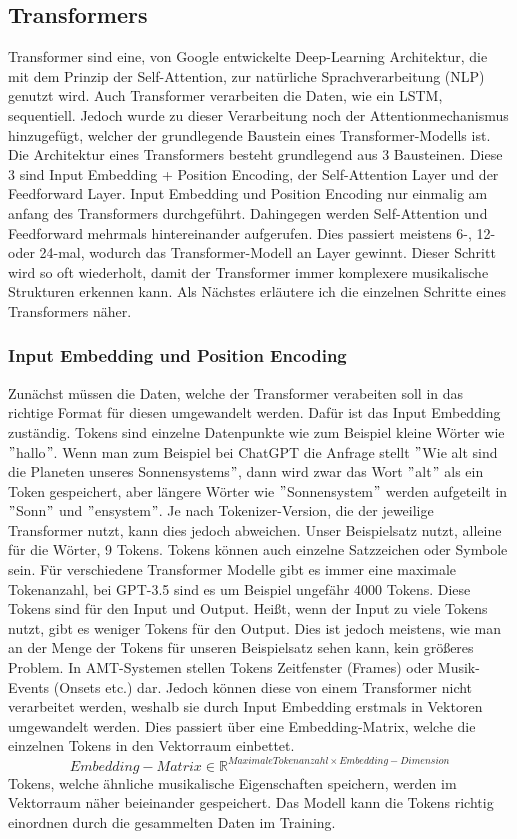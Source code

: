 \subsection{Transformers}
Transformer sind eine, von Google entwickelte Deep-Learning Architektur,
die mit dem Prinzip der Self-Attention, zur natürliche Sprachverarbeitung (NLP) genutzt wird.
Auch Transformer verarbeiten die Daten, wie ein LSTM, sequentiell.
Jedoch wurde zu dieser Verarbeitung noch der Attentionmechanismus hinzugefügt,
welcher der grundlegende Baustein eines Transformer-Modells ist.
Die Architektur eines Transformers besteht grundlegend aus 3 Bausteinen.
Diese 3 sind Input Embedding + Position Encoding, der Self-Attention Layer und der Feedforward Layer.
Input Embedding und Position Encoding nur einmalig am anfang des Transformers durchgeführt.
Dahingegen werden Self-Attention und Feedforward mehrmals hintereinander aufgerufen.
Dies passiert meistens 6-, 12- oder 24-mal, wodurch das Transformer-Modell an Layer gewinnt.
Dieser Schritt wird so oft wiederholt, damit der Transformer immer komplexere musikalische Strukturen erkennen kann.
Als Nächstes erläutere ich die einzelnen Schritte eines Transformers näher.

\subsubsection{Input Embedding und Position Encoding}
Zunächst müssen die Daten, welche der Transformer verabeiten soll in das richtige Format für diesen umgewandelt werden.
Dafür ist das Input Embedding zuständig.
Tokens sind einzelne Datenpunkte wie zum Beispiel kleine Wörter wie \("\)hallo\("\).
Wenn man zum Beispiel bei ChatGPT die Anfrage stellt \("\)Wie alt sind die Planeten unseres Sonnensystems\("\),
dann wird zwar das Wort \("\)alt\("\) als ein Token gespeichert, aber längere Wörter wie \("\)Sonnensystem\("\)
werden aufgeteilt in \("\)Sonn\("\) und \("\)ensystem\("\).
Je nach Tokenizer-Version, die der jeweilige Transformer nutzt, kann dies jedoch abweichen.
Unser Beispielsatz nutzt, alleine für die Wörter, 9 Tokens.
Tokens können auch einzelne Satzzeichen oder Symbole sein.
Für verschiedene Transformer Modelle gibt es immer eine maximale Tokenanzahl,
bei GPT-3.5 sind es um Beispiel ungefähr 4000 Tokens.
Diese Tokens sind für den Input und Output.
Heißt, wenn der Input zu viele Tokens nutzt, gibt es weniger Tokens für den Output.
Dies ist jedoch meistens, wie man an der Menge der Tokens für unseren Beispielsatz sehen kann, kein größeres Problem.
In AMT-Systemen stellen Tokens Zeitfenster (Frames) oder Musik-Events (Onsets etc.) dar.
Jedoch können diese von einem Transformer nicht verarbeitet werden,
weshalb sie durch Input Embedding erstmals in Vektoren  umgewandelt werden.
Dies passiert über eine Embedding-Matrix, welche die einzelnen Tokens in den Vektorraum einbettet.
\[
Embedding-Matrix \in \mathbb{R}^{Maximale Tokenanzahl \times Embedding-Dimension}
\]
Tokens, welche ähnliche musikalische Eigenschaften speichern, werden im Vektorraum näher beieinander gespeichert.
Das Modell kann die Tokens richtig einordnen durch die gesammelten Daten im Training.

